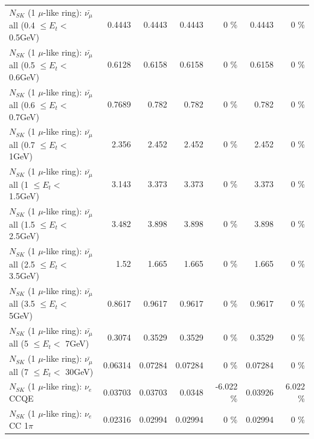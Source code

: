\begin{table}
\begin{tabular}{| l | r | r | r  r | r  r |}
 $N_{SK}$ (1 $\mu$-like ring): $\bar{\nu_{\mu}}$ all (0.4 $\leq E_{t} <$ 0.5GeV) &          0.4443 &          0.4443 &          0.4443 &        0 \%  &          0.4443 &        0 \%  \\ 
 $N_{SK}$ (1 $\mu$-like ring): $\bar{\nu_{\mu}}$ all (0.5 $\leq E_{t} <$ 0.6GeV) &          0.6128 &          0.6158 &          0.6158 &        0 \%  &          0.6158 &        0 \%  \\ 
 $N_{SK}$ (1 $\mu$-like ring): $\bar{\nu_{\mu}}$ all (0.6 $\leq E_{t} <$ 0.7GeV) &          0.7689 &           0.782 &           0.782 &        0 \%  &           0.782 &        0 \%  \\ 
   $N_{SK}$ (1 $\mu$-like ring): $\bar{\nu_{\mu}}$ all (0.7 $\leq E_{t} <$ 1GeV) &           2.356 &           2.452 &           2.452 &        0 \%  &           2.452 &        0 \%  \\ 
   $N_{SK}$ (1 $\mu$-like ring): $\bar{\nu_{\mu}}$ all (1 $\leq E_{t} <$ 1.5GeV) &           3.143 &           3.373 &           3.373 &        0 \%  &           3.373 &        0 \%  \\ 
 $N_{SK}$ (1 $\mu$-like ring): $\bar{\nu_{\mu}}$ all (1.5 $\leq E_{t} <$ 2.5GeV) &           3.482 &           3.898 &           3.898 &        0 \%  &           3.898 &        0 \%  \\ 
 $N_{SK}$ (1 $\mu$-like ring): $\bar{\nu_{\mu}}$ all (2.5 $\leq E_{t} <$ 3.5GeV) &            1.52 &           1.665 &           1.665 &        0 \%  &           1.665 &        0 \%  \\ 
   $N_{SK}$ (1 $\mu$-like ring): $\bar{\nu_{\mu}}$ all (3.5 $\leq E_{t} <$ 5GeV) &          0.8617 &          0.9617 &          0.9617 &        0 \%  &          0.9617 &        0 \%  \\ 
     $N_{SK}$ (1 $\mu$-like ring): $\bar{\nu_{\mu}}$ all (5 $\leq E_{t} <$ 7GeV) &          0.3074 &          0.3529 &          0.3529 &        0 \%  &          0.3529 &        0 \%  \\ 
    $N_{SK}$ (1 $\mu$-like ring): $\bar{\nu_{\mu}}$ all (7 $\leq E_{t} <$ 30GeV) &         0.06314 &         0.07284 &         0.07284 &        0 \%  &         0.07284 &        0 \%  \\ 
\hline
\hline
\hline
                                      $N_{SK}$ (1 $\mu$-like ring): $\nu_e$ CCQE &         0.03703 &         0.03703 &          0.0348 &   -6.022 \%  &         0.03926 &    6.022 \%  \\ 
                                 $N_{SK}$ (1 $\mu$-like ring): $\nu_e$ CC 1$\pi$ &         0.02316 &         0.02994 &         0.02994 &        0 \%  &         0.02994 &        0 \%  \\ 

\end{tabular}
\end{table}
